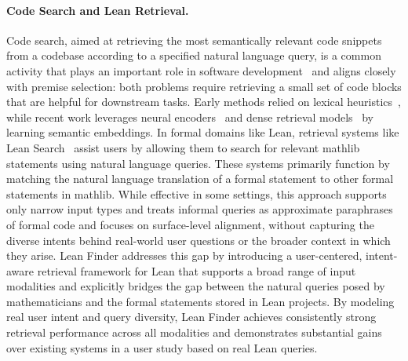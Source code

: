 \documentclass{article} %
\begin{document}
\paragraph{Code Search and Lean Retrieval.}
Code search, aimed at retrieving the most semantically relevant code snippets from a codebase according to a specified natural language query, is a common activity that plays an important role in software development~\citep{husain2019codesearchnet,wang2023codet5+} and aligns closely with premise selection: both problems require retrieving a small set of code blocks that are helpful for downstream tasks.
Early methods relied on lexical heuristics~\citep{alama2014premise,urban2004mptp}, while recent work leverages neural encoders~\citep{irving2016deepmath,wang2020learning,mikula2023magnushammer,yeh2023coprover} and dense retrieval models~\citep{karpukhin2020dense,qu2020rocketqa} by learning semantic embeddings. 
In formal domains like Lean,  retrieval systems like Lean Search~\citep{gao2024semantic,gao2024herald} assist users by allowing them to search for relevant mathlib statements using natural language queries. These systems primarily function by matching the natural language translation of a formal statement to other formal statements in mathlib. While effective in some settings, this approach supports only narrow input types and treats informal queries as approximate paraphrases of formal code and focuses on surface-level alignment, without capturing the diverse intents behind real-world user questions or the broader context in which they arise.
Lean Finder addresses this gap by introducing a user-centered, intent-aware retrieval framework for Lean that supports a broad range of input modalities and explicitly bridges the gap between the natural queries posed by mathematicians and the formal statements stored in Lean projects. By modeling real user intent and query diversity, Lean Finder achieves consistently strong retrieval performance across all modalities and demonstrates substantial gains over existing systems in a user study based on real Lean queries.
\end{document}
